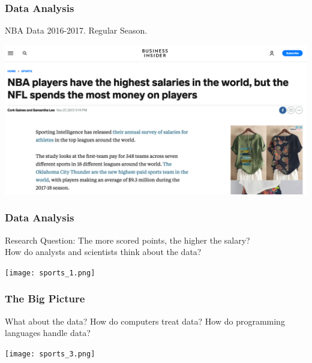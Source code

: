 \documentclass{beamer}
\begin{document}
\begin{frame}
\frametitle{Data Analysis}
NBA Data 2016-2017. Regular Season. 

\begin{center}
\includegraphics[scale=0.25]{./figures/sports.png}
\end{center}

\end{frame}
\begin{frame}
\frametitle{Data Analysis}
Research Question: The more scored points, the higher the salary? \\[10pt]

How do analysts and scientists think about the data?

\begin{center}
\texttt{[image: sports\_1.png]}
\end{center}

\end{frame}
\begin{frame}
\frametitle{The Big Picture}
What about the data? How do computers treat data? How do programming languages handle data? 

\begin{center}
\texttt{[image: sports\_3.png]}
\end{center}


\end{frame}
\end{document}

